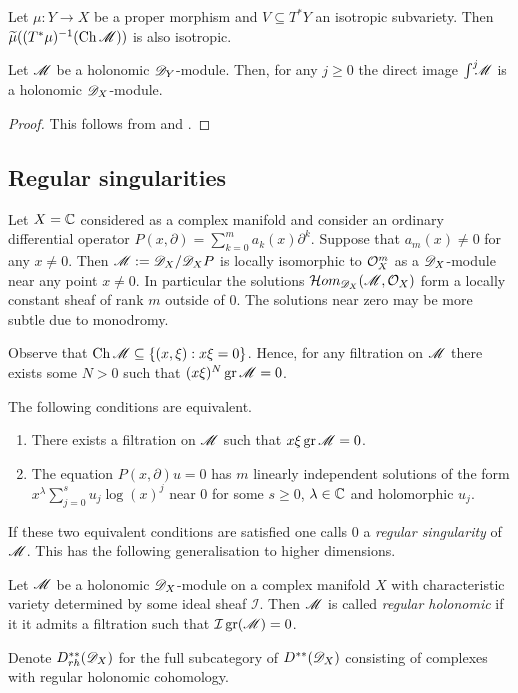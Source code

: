 \begin{lemma}{\cite[Proposition 4.9.]{kashiwara1976b}}\label{lem: IsotropicDirectImage}
  Let $\mu:Y\to X$ be a proper morphism and $V\subseteq T^*Y$ an isotropic subvariety. Then $\widetilde{\mu}((T^*\mu)^{-1}(\operatorname{Ch} \mathscr{M}) )$ is also isotropic.
\end{lemma}
\begin{corollary}\label{cor: RelHolConserved}
  Let $\mathscr{M}$ be a holonomic $\mathscr{D}_Y$-module.
  Then, for any $j\geq 0$ the direct image $\int^j \mkern -8mu\mathscr{M}$ is a holonomic $\mathscr{D}_X$-module.
\end{corollary}
\begin{proof}
  This follows from  and .
\end{proof}
\subsection{Regular singularities}
Let $X=\mathbb{C}$ considered as a complex manifold and consider an ordinary differential operator
$P(x,\partial) = \sum_{k=0}^m a_k(x)\partial^k.$
Suppose that $a_m(x)\neq 0$ for any $x\neq 0$.
Then $\mathscr{M} :=\mathscr{D}_X/\mathscr{D}_X P$ is locally isomorphic to $\mathcal{O}_X^m$ as a $\mathscr{D}_X$-module near any point $x\neq 0$.
In particular the solutions $\mathcal{H}om_{\mathscr{D}_X}(\mathscr{M},\mathcal{O}_X)$ form a locally constant sheaf of rank $m$ outside of $0$.
The solutions near zero may be more subtle due to monodromy.

Observe that $\operatorname{Ch} \mathscr{M}\subseteq \{(x,\xi): x\xi = 0\}$.
Hence, for any filtration on $\mathscr{M}$ there exists some $N>0$ such that
$(x\xi)^N \operatorname{gr}\mathscr{M} = 0 $.
\begin{proposition}{\cite[Section 5.1]{kashiwara2003d}}
  The following conditions are equivalent.
  \begin{enumerate}
    \item There exists a filtration on $\mathscr{M}$ such that $x\xi\operatorname{gr}\mathscr{M} = 0$.
    \item The equation $P(x,\partial)u=0$ has $m$ linearly independent solutions of the form $x^\lambda \sum_{j=0}^s u_j \log(x)^j $
    near $0$ for some $s\geq 0$, $\lambda \in \mathbb{C}$ and holomorphic $u_j$.
  \end{enumerate}
\end{proposition}
If these two equivalent conditions are satisfied one calls $0$ a {\it regular singularity} of $\mathscr{M}$.
This has the following generalisation to higher dimensions.
\begin{definition}
   Let $\mathscr{M}$ be a holonomic $\mathscr{D}_X$-module on a complex manifold $X$ with characteristic variety determined by some ideal sheaf $\mathcal{I}$.
   Then $\mathscr{M}$ is called {\it regular holonomic} if it it admits a filtration such that $\mathcal{I} \operatorname{gr}(\mathscr{M}) = 0$.
\end{definition}
Denote $D^{**}_{rh}(\mathscr{D}_X)$ for the full subcategory of $D^{**}(\mathscr{D}_X)$ consisting of complexes with regular holonomic cohomology.

